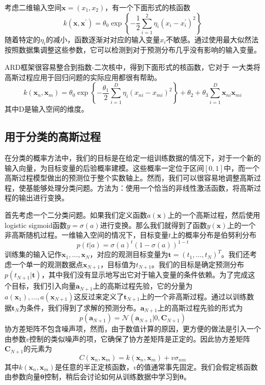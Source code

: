 考虑二维输入空间$\boldsymbol{x}=(x_1,x_2)$，有一个下面形式的核函数
\begin{equation}
	k(\boldsymbol{x},\boldsymbol{x}^{'})=\theta_0\exp\left\{-\frac{1}{2}\sum_{i=1}^{2}\eta_i(x_i-x_i^{'})^2 \right\}
\end{equation}
随着特定的$\eta_i$的减小，函数逐渐对对应的输入变量$x_i$不敏感。通过使用最大似然法按照数据集调整这些参数，它可以检测到对于预测分布几乎没有影响的输入变量。

ARD框架很容易整合到指数-二次核中，得到下面形式的核函数，它对于 一大类将高斯过程应用于回归问题的实际应用都很有帮助。
\begin{equation}
	k(\boldsymbol{x}_n,\boldsymbol{x}_m)=\theta_0\exp\left\{-\frac{\theta_1}{2}\sum_{i=1}^{D}\eta_i(x_{ni}-x_{mi})^2 \right\}+\theta_2+\theta_3\sum_{i=1}^{D}\boldsymbol{x}_{ni}\boldsymbol{x}_{mi}
\end{equation}
其中D是输入空间的维度。
\subsection*{用于分类的高斯过程}
在分类的概率方法中，我们的目标是在给定一组训练数据的情况下，对于一个新的输入向量，为目标变量的后验概率建模。这些概率一定位于区间$[0,1]$中，而一个高斯过程模型做出的预测位于整个实数轴上。然而，我们可以很容易地调整高斯过程，使基能够处理分类问题。方法为：使用一个恰当的非线性激活函数，将高斯过程的输出进行变换。

首先考虑一个二分类问题。如果我们定义函数$a(\boldsymbol{x})$上的一个高斯过程，然后使用logistic sigmoid函数$y=\sigma(a)$进行变换。那么我们就得到了函数$y(\boldsymbol{x})$上的一个非高斯随机过程。一维输入空间的情况下，目标变量$t$上的概率分布是伯努利分布
\begin{equation}
	p(t|a)=\sigma(a)^t(1-\sigma(a))^{1-t}
\end{equation}
训练集的输入记作$\boldsymbol{x}_1,\dots,\boldsymbol{x}_N$，对应的观测目标变量为$\boldsymbol{t}=(t_1,\dots,t_N)^T$。我们还考虑一个单一的观测数据点$\boldsymbol{x}_{N+1}$，目标值为$t_{N+1}$。我们的目标是确定预测分布$p(t_{N+1}|\boldsymbol{t})$，其中我们没有显示地写出它对于输入变量的条件依赖。为了完成这个目标，我们引入向量$\boldsymbol{a}_{N+1}$上的高斯过程先验，它的分量为$a(\boldsymbol{x}_1),\dots,a(\boldsymbol{x}_{N+1})$这反过来定义了$\boldsymbol{t}_{N+1}$上的一个非高斯过程。通过以训练数据$\boldsymbol{t}_{N}$为条件，我们得到了求解的预测分布。$\boldsymbol{a}_{N+1}$上的高斯过程先验的形式为
\begin{equation}
	p(\boldsymbol{a}_{N+1})=\mathcal{N}(\boldsymbol{a}_{N+1}|0,\boldsymbol{C}_{N+1})
\end{equation}
协方差矩阵不包含噪声项，然而，由于数值计算的原因，更方便的做法是引入一个由参数$v$控制的类似噪声的项，它确保了协方差矩阵是正定的。因此协方差矩阵$\boldsymbol{C}_{N+1}$的元素为
\begin{equation}
	C(\boldsymbol{x}_n,\boldsymbol{x}_m)=k(\boldsymbol{x}_n,\boldsymbol{x}_m)+v\sigma_{nm}
\end{equation}
其中$k(\boldsymbol{x}_n,\boldsymbol{x}_m)$是任意的半正定核函数，$v$的值通常事先固定。我们会假定核函数由参数向量$\boldsymbol{\theta}$控制，稍后会讨论如何从训练数据中学习到$\boldsymbol{\theta}$。

